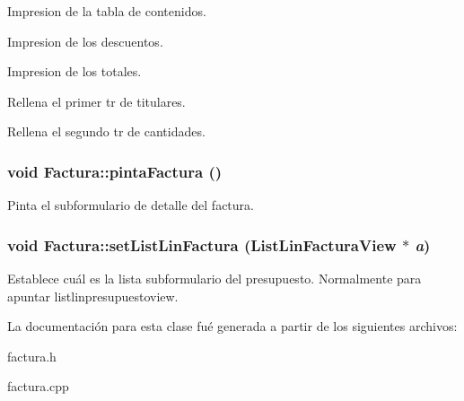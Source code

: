 Impresion de la tabla de contenidos.

Impresion de los descuentos.

Impresion de los totales.

Rellena el primer tr de titulares.

Rellena el segundo tr de cantidades. 
\subsubsection{\setlength{\rightskip}{0pt plus 5cm}void Factura::pinta\-Factura ()}\label{classFactura_a25}


Pinta el subformulario de detalle del factura. 
\subsubsection{\setlength{\rightskip}{0pt plus 5cm}void Factura::set\-List\-Lin\-Factura ({\bf List\-Lin\-Factura\-View} $\ast$ {\em a})\hspace{0.3cm}{\tt  [inline]}}\label{classFactura_a45}


Establece cu\'{a}l es la lista subformulario del presupuesto. Normalmente para apuntar listlinpresupuestoview. 

La documentaci\'{o}n para esta clase fu\'{e} generada a partir de los siguientes archivos:\begin{CompactItemize}
\item 
factura.h\item 
factura.cpp\end{CompactItemize}
